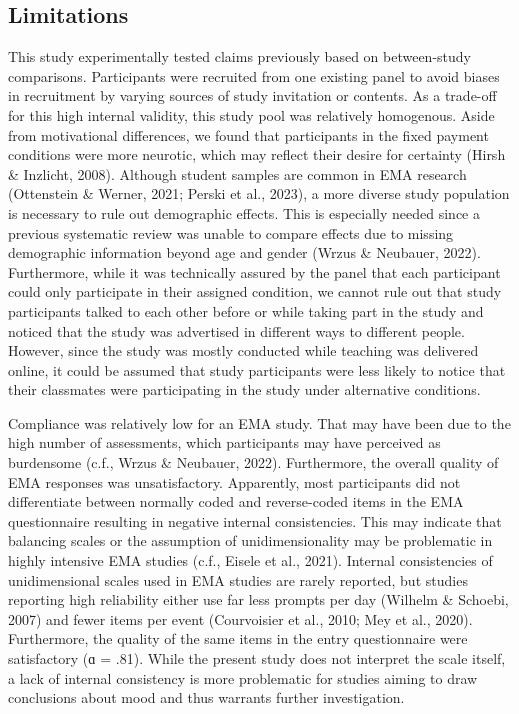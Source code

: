 \documentclass[authordate, empirical]{jote-new-article}
\begin{document}
	\subsection{Limitations}



	This study experimentally tested claims previously based on between-study comparisons. Participants were recruited from one existing panel to avoid biases in recruitment by varying sources of study invitation or contents. As a trade-off for this high internal validity, this study pool was relatively homogenous. Aside from motivational differences, we found that participants in the fixed payment conditions were more neurotic, which may reflect their desire for certainty (Hirsh \& Inzlicht, 2008). Although student samples are common in EMA research (Ottenstein \& Werner, 2021; Perski et al., 2023), a more diverse study population is necessary to rule out demographic effects. This is especially needed since a previous systematic review was unable to compare effects due to missing demographic information beyond age and gender (Wrzus \& Neubauer, 2022). Furthermore, while it was technically assured by the panel that each participant could only participate in their assigned condition, we cannot rule out that study participants talked to each other before or while taking part in the study and noticed that the study was advertised in different ways to different people. However, since the study was mostly conducted while teaching was delivered online, it could be assumed that study participants were less likely to notice that their classmates were participating in the study under alternative conditions.



	Compliance was relatively low for an EMA study. That may have been due to the high number of assessments, which participants may have perceived as burdensome (c.f., Wrzus \& Neubauer, 2022). Furthermore, the overall quality of EMA responses was unsatisfactory. Apparently, most participants did not differentiate between normally coded and reverse-coded items in the EMA questionnaire resulting in negative internal consistencies. This may indicate that balancing scales or the assumption of unidimensionality may be problematic in highly intensive EMA studies (c.f., Eisele et al., 2021). Internal consistencies of unidimensional scales used in EMA studies are rarely reported, but studies reporting high reliability either use far less prompts per day (Wilhelm \& Schoebi, 2007) and fewer items per event (Courvoisier et al., 2010; Mey et al., 2020). Furthermore, the quality of the same items in the entry questionnaire were satisfactory (ɑ = .81). While the present study does not interpret the scale itself, a lack of internal consistency is more problematic for studies aiming to draw conclusions about mood and thus warrants further investigation.
\end{document}
